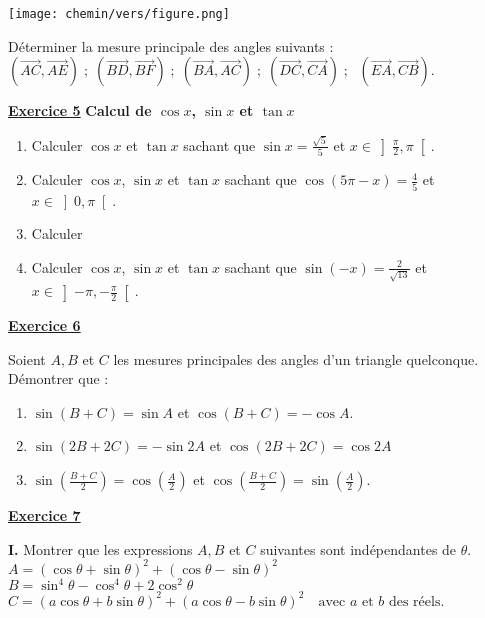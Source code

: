 \documentclass[12pt,a4paper]{article}
\begin{document}
\begin{multicols}{2}
\begin{center}
    \texttt{[image: chemin/vers/figure.png]}
\end{center}

Déterminer la mesure principale des angles suivants :
\( (\overrightarrow{AC}, \overrightarrow{AE}) \;;\; 
(\overrightarrow{BD}, \overrightarrow{BF}) \;;\; 
(\overrightarrow{BA}, \overrightarrow{AC}) \;;\; 
(\overrightarrow{DC}, \overrightarrow{CA}) \;;\; \)
\( (\overrightarrow{EA}, \overrightarrow{CB}) \).

\textbf{\underline{Exercice 5}}
\textbf{ Calcul de \( \cos x \), \( \sin x \) et \( \tan x \)} 

\begin{enumerate}
    \item Calculer \( \cos x \) et \( \tan x \) sachant que \( \sin x = \frac{\sqrt{5}}{5} \) et \( x \in \left] \frac{\pi}{2}, \pi \right[ \).

    \item Calculer \( \cos x \), \( \sin x \) et \( \tan x \) sachant que \( \cos(5\pi - x) = \frac{4}{5} \) et \( x \in \left] 0, \pi \right[ \).

    \item Calculer

    \item Calculer \( \cos x \), \( \sin x \) et \( \tan x \) sachant que \( \sin(-x) = \frac{2}{\sqrt{13}} \) et \( x \in \left] -\pi, -\frac{\pi}{2} \right[ \).
\end{enumerate}
\textbf{\underline{Exercice 6}}

Soient \( A, B \) et \( C \) les mesures principales des angles d’un triangle quelconque.\\
Démontrer que :

\begin{enumerate}
    \item \( \sin(B + C) = \sin A \) et \( \cos(B + C) = -\cos A \).

    \item \( \sin(2B + 2C) = -\sin 2A \) et \( \cos(2B + 2C) = \cos 2A \)

    \item \( \sin\left( \frac{B + C}{2} \right) = \cos\left( \frac{A}{2} \right) \) et 
    \( \cos\left( \frac{B + C}{2} \right) = \sin\left( \frac{A}{2} \right) \).
\end{enumerate}
\textbf{\underline{Exercice 7}}

\textbf{I.} Montrer que les expressions \( A, B \) et \( C \) suivantes sont indépendantes de \( \theta \).\\
\(
A = (\cos \theta + \sin \theta)^2 + (\cos \theta - \sin \theta)^2
\)\\
\(
B = \sin^4 \theta - \cos^4 \theta + 2\cos^2 \theta
\)\\
\(
C = (a \cos \theta + b \sin \theta)^2 + (a \cos \theta - b \sin \theta)^2 \quad \text{avec } a \text{ et } b \text{ des réels.}
\)


\end{multicols}
\end{document}
